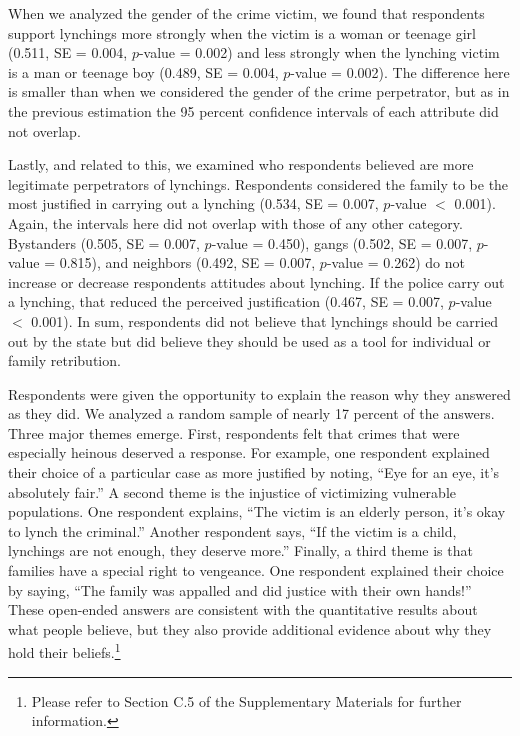 \documentclass[12pt,a4paper]{article}
\begin{document}
When we analyzed the gender of the crime victim, we found that respondents
support lynchings more strongly when the victim is a woman or teenage girl
(0.511, SE = 0.004, $p$-value = 0.002) and less strongly when the lynching
victim is a man or teenage boy (0.489, SE = 0.004, $p$-value = 0.002). The
difference here is smaller than when we considered the gender of the crime
perpetrator, but as in the previous estimation the 95 percent confidence
intervals of each attribute did not overlap. 

Lastly, and related to this, we examined who respondents believed are more
legitimate perpetrators of lynchings. Respondents considered the family to be
the most justified in carrying out a lynching (0.534, SE = 0.007, $p$-value $<$
0.001). Again, the intervals here did not overlap with those of any other
category. Bystanders (0.505, SE = 0.007, $p$-value = 0.450), gangs (0.502, SE =
0.007, $p$-value = 0.815), and neighbors (0.492, SE = 0.007, $p$-value = 0.262)
do not increase or decrease respondents attitudes about lynching. If the police
carry out a lynching, that reduced the perceived justification (0.467, SE =
0.007, $p$-value $<$ 0.001). In sum, respondents did not believe that lynchings
should be carried out by the state but did believe they should be used as a
tool for individual or family retribution.

Respondents were given the opportunity to explain the reason why they answered
as they did. We analyzed a random sample of nearly 17 percent of the answers.
Three major themes emerge. First, respondents felt that crimes that were
especially heinous deserved a response. For example, one respondent explained
their choice of a particular case as more justified by noting, ``Eye for an
eye, it's absolutely fair.'' A second  theme is the injustice of victimizing
vulnerable populations. One respondent explains, ``The victim is an elderly
person, it's okay to lynch the criminal.'' Another respondent says, ``If the
victim is a child, lynchings are not enough, they deserve more.'' Finally, a
third theme is that families have a special right to vengeance. One respondent
explained their choice by saying, ``The family was appalled and did justice
with their own hands!'' These open-ended answers are consistent with the
quantitative results about what people believe, but they also provide
additional evidence about why they hold their beliefs.\footnote{Please refer to
Section C.5 of the Supplementary Materials for further information.} 

\end{document}
